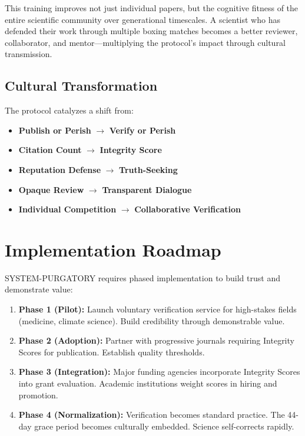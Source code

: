 \documentclass[11pt,a4paper]{article}
\begin{document}
\begin{small}
This training improves not just individual papers, but the cognitive fitness of the entire scientific community over generational timescales. A scientist who has defended their work through multiple boxing matches becomes a better reviewer, collaborator, and mentor—multiplying the protocol's impact through cultural transmission.

\subsection{Cultural Transformation}
The protocol catalyzes a shift from:
\begin{itemize}[nosep]
    \item \textbf{Publish or Perish} $\rightarrow$ \textbf{Verify or Perish}
    \item \textbf{Citation Count} $\rightarrow$ \textbf{Integrity Score}
    \item \textbf{Reputation Defense} $\rightarrow$ \textbf{Truth-Seeking}
    \item \textbf{Opaque Review} $\rightarrow$ \textbf{Transparent Dialogue}
    \item \textbf{Individual Competition} $\rightarrow$ \textbf{Collaborative Verification}
\end{itemize}

\section{Implementation Roadmap}
SYSTEM-PURGATORY requires phased implementation to build trust and demonstrate value:

\begin{enumerate}
    \item \textbf{Phase 1 (Pilot):} Launch voluntary verification service for high-stakes fields (medicine, climate science). Build credibility through demonstrable value.
    
    \item \textbf{Phase 2 (Adoption):} Partner with progressive journals requiring Integrity Scores for publication. Establish quality thresholds.
    
    \item \textbf{Phase 3 (Integration):} Major funding agencies incorporate Integrity Scores into grant evaluation. Academic institutions weight scores in hiring and promotion.
    
    \item \textbf{Phase 4 (Normalization):} Verification becomes standard practice. The 44-day grace period becomes culturally embedded. Science self-corrects rapidly.
\end{enumerate}


\end{small}
\end{document}
